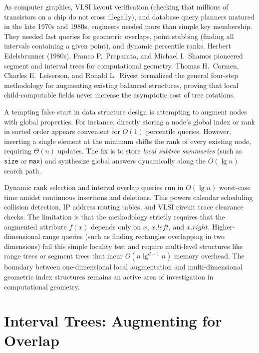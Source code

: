 \begin{historybox}
As computer graphics, VLSI layout verification (checking that millions of transistors on a chip do not cross illegally), and database query planners matured in the late 1970s and 1980s, engineers needed more than simple key membership. They needed fast queries for geometric overlaps, point stabbing (finding all intervals containing a given point), and dynamic percentile ranks. Herbert Edelsbrunner (1980s), Franco P.~Preparata, and Michael I.~Shamos pioneered segment and interval trees for computational geometry. Thomas H.~Cormen, Charles E.~Leiserson, and Ronald L.~Rivest formalized the general four-step methodology for augmenting existing balanced structures, proving that local child-computable fields never increase the asymptotic cost of tree rotations.

A tempting false start in data structure design is attempting to augment nodes with global properties. For instance, directly storing a node's global index or rank in sorted order appears convenient for $O(1)$ percentile queries. However, inserting a single element at the minimum shifts the rank of every existing node, requiring $\Theta(n)$ updates. The fix is to store \emph{local subtree summaries} (such as \texttt{size} or \texttt{max}) and synthesize global answers dynamically along the $O(\lg n)$ search path.

Dynamic rank selection and interval overlap queries run in $O(\lg n)$ worst-case time amidst continuous insertions and deletions. This powers calendar scheduling collision detection, IP address routing tables, and VLSI circuit trace clearance checks. The limitation is that the methodology strictly requires that the augmented attribute $f(x)$ depends only on $x$, $x.\mathit{left}$, and $x.\mathit{right}$. Higher-dimensional range queries (such as finding rectangles overlapping in two dimensions) fail this simple locality test and require multi-level structures like range trees or segment trees that incur $O(n \lg^{d-1} n)$ memory overhead. The boundary between one-dimensional local augmentation and multi-dimensional geometric index structures remains an active area of investigation in computational geometry.
\end{historybox}

\section{Interval Trees: Augmenting for Overlap}
\label{ch14:sec-interval}

